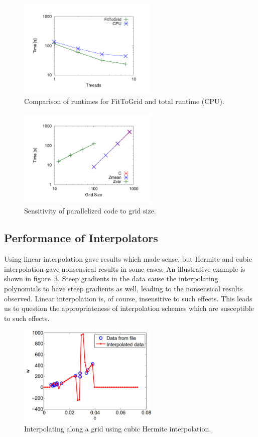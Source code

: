 \documentclass[11pt]{article}
\begin{document}
\begin{figure} [h]
\centering
\includegraphics[width=0.6\textwidth]{plot_threads}
\caption{\label{fig:fittogrid} Comparison of runtimes for FitToGrid and total runtime (CPU).}
\end{figure}

\begin{figure} [h]
\centering
\includegraphics[width=0.6\textwidth]{plot_gridsizes}
\caption{\label{fig:gridsensitivity} Sensitivity of parallelized code to grid size.}
\end{figure}

\subsection{Performance of Interpolators}
Using linear interpolation gave results which made sense, but Hermite and cubic interpolation gave nonsensical results in some cases. An illustrative example is shown in figure~\ref{fig:interpolator}. Steep gradients in the data cause the interpolating polynomials to have steep gradients as well, leading to the nonsensical results observed. Linear interpolation is, of course, insensitive to such effects. This leads us to question the appropriateness of interpolation schemes which are susceptible to such effects.

\begin{figure} [h]
\centering
\includegraphics[width=0.6\textwidth]{interpolator}
\caption{\label{fig:interpolator} Interpolating along a grid using cubic Hermite interpolation.}
\end{figure}
\end{document}
